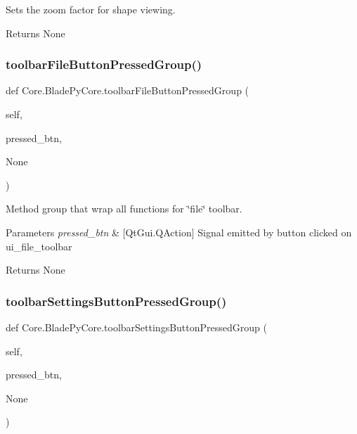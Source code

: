 Sets the zoom factor for shape viewing. 

\begin{DoxyReturn}{Returns}
None 
\end{DoxyReturn}
\hypertarget{a00079_ab5cf733dc40f2b17761056148fd51263}{}\label{a00079_ab5cf733dc40f2b17761056148fd51263} 
\subsubsection{\texorpdfstring{toolbar\+File\+Button\+Pressed\+Group()}{toolbarFileButtonPressedGroup()}}
{\footnotesize\ttfamily def Core.\+Blade\+Py\+Core.\+toolbar\+File\+Button\+Pressed\+Group (\begin{DoxyParamCaption}\item[{}]{self,  }\item[{}]{pressed\+\_\+btn,  }\item[{}]{None }\end{DoxyParamCaption})}



Method group that wrap all functions for \char`\"{}file\char`\"{} toolbar. 


\begin{DoxyParams}{Parameters}
{\em pressed\+\_\+btn} & \mbox{[}Qt\+Gui.\+Q\+Action\mbox{]} Signal emitted by button clicked on ui\+\_\+file\+\_\+toolbar \\
\hline
\end{DoxyParams}
\begin{DoxyReturn}{Returns}
None 
\end{DoxyReturn}
\hypertarget{a00079_abe6ec5c591c19b280f2e24bb198a1d6b}{}\label{a00079_abe6ec5c591c19b280f2e24bb198a1d6b} 
\subsubsection{\texorpdfstring{toolbar\+Settings\+Button\+Pressed\+Group()}{toolbarSettingsButtonPressedGroup()}}
{\footnotesize\ttfamily def Core.\+Blade\+Py\+Core.\+toolbar\+Settings\+Button\+Pressed\+Group (\begin{DoxyParamCaption}\item[{}]{self,  }\item[{}]{pressed\+\_\+btn,  }\item[{}]{None }\end{DoxyParamCaption})}



